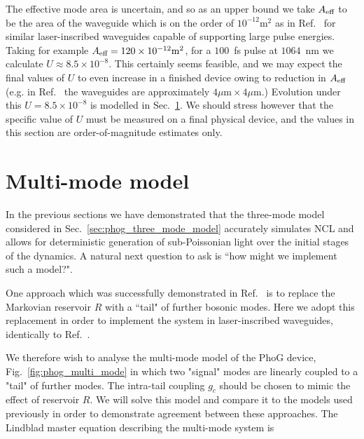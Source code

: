 The effective mode area is uncertain, and so as an upper bound we take $A_{\text{eff}}$ to be the area of the waveguide which is on the order of $10^{-12}\text{m}^2$ as in Ref.~\cite{Mukherjee2017} for similar laser-inscribed waveguides  capable of supporting large pulse energies. Taking for example $A_{\text{eff}} = 120\times10^{-12} \text{m}^2$, for a $100$~fs pulse at $1064$~nm we calculate $U \approx 8.5\times 10^{-8}$. This certainly seems feasible, and we may expect the final values of $U$ to even increase in a finished device owing to reduction in $A_{\text{eff}}$ (e.g. in Ref.~\cite{Mukherjee2017} the waveguides are approximately $4 \mu\text{m} \times 4 \mu\text{m}$.) Evolution under this $U = 8.5\times10^{-8}$ is modelled in Sec.~\ref{sec:phog_multi_mode}. We should stress however that the specific value of $U$ must be measured on a final physical device, and the values in this section are order-of-magnitude estimates only.





\section{Multi-mode model}\label{sec:phog_multi_mode}
In the previous sections we have demonstrated that the three-mode model considered in Sec.~\ref{sec:phog_three_mode_model} accurately simulates NCL and allows for deterministic generation of sub-Poissonian light over the initial stages of the dynamics. A natural next question to ask is ``how might we implement such a model?". %

One approach which was successfully demonstrated in Ref.~\cite{Mukherjee2017} is to replace the Markovian reservoir $R$ with a ``tail" of further bosonic modes. %
Here we adopt this replacement in order to implement the system in laser-inscribed waveguides, identically to Ref.~\cite{Mukherjee2015, Mukherjee2017}.

We therefore wish to analyse the multi-mode model of the PhoG device, Fig.~\ref{fig:phog_multi_mode} in which two "signal" modes are linearly coupled to a "tail" of further modes. The intra-tail coupling $g_c$ should be chosen to mimic the effect of reservoir $R$. We will solve this model and compare it to the models used previously in order to demonstrate agreement between these approaches. %
The Lindblad master equation describing the multi-mode system is

